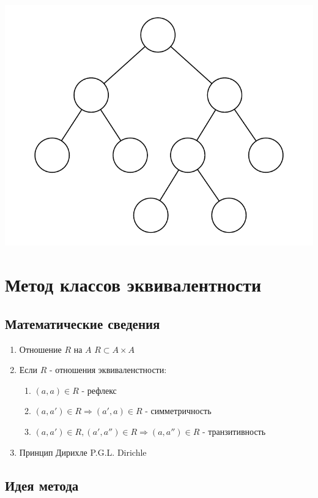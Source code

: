 \documentclass[a4paper, 14pt]{report}
\begin{document}
\begin{center}
    \includegraphics{anal2}
\end{center}

\chapter{Метод классов эквивалентности}

\section{Математические сведения}

\begin{enumerate}
    \item Отношение $R$ на $A$ $R \subset A \times A$
    \item Если $R$ - отношения эквиваленстности:

        \begin{enumerate}
            \item $(a,a) \in R$ - рефлекс
            \item $(a,a') \in R \Rightarrow (a',a) \in R$ - симметричность
            \item $(a,a') \in R, (a', a'') \in R \Rightarrow (a,a'') \in R$ - транзитивность
        \end{enumerate}

    \item Принцип Дирихле P.G.L. Dirichle
\end{enumerate}

\section{Идея метода}
\end{document}
